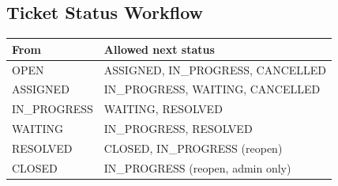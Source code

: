 \documentclass[12pt,a4paper]{article}
\begin{document}
\subsection{Ticket Status Workflow}
\begin{center}
\begin{tabular}{@{}ll@{}}
\toprule
\textbf{From} & \textbf{Allowed next status}\\
\midrule
OPEN        & ASSIGNED, IN\_PROGRESS, CANCELLED\\
ASSIGNED    & IN\_PROGRESS, WAITING, CANCELLED\\
IN\_PROGRESS& WAITING, RESOLVED\\
WAITING     & IN\_PROGRESS, RESOLVED\\
RESOLVED    & CLOSED, IN\_PROGRESS (reopen)\\
CLOSED      & IN\_PROGRESS (reopen, admin only)\\
\bottomrule
\end{tabular}
\end{center}

\end{document}
